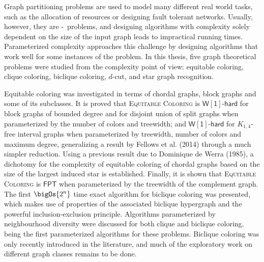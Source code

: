 Graph partitioning problems are used to model many different real world tasks, such as the allocation of resources or designing fault tolerant networks.
Usually, however, they are \NP-\Hard\ problems, and designing algorithms with complexity solely dependent on the size of the input graph leads to impractical running times.
Parameterized complexity approaches this challenge by designing algorithms that work well for some instances of the problem.
In this thesis, five graph theoretical problems were studied from the complexity point of view: equitable coloring, clique coloring, biclique coloring, $d$-cut, and star graph recognition.

Equitable coloring was investigated in terms of chordal graphs, block graphs and some of its subclasses.
It is proved that \textsc{Equitable Coloring} is  
$\mathsf{W[1]\text{-}hard}$ for block graphs of bounded degree and for disjoint union of split graphs when parameterized by the number of colors and treewidth; and %
$\mathsf{W[1]\text{-}hard}$ for $K_{1,4}$-free interval graphs when parameterized by treewidth, number of colors and maximum degree, generalizing a result by Fellows et al. (2014) through a much simpler reduction.
Using a previous result due to Dominique de Werra (1985), a dichotomy for the complexity of equitable coloring of chordal graphs based on the size of the largest induced star is established.
Finally, it is shown that 
\textsc{Equitable Coloring} is $\mathsf{FPT}$ when parameterized by the treewidth of the complement graph.
The first $\bigOs{2^n}$ time exact algorithm for biclique coloring was presented, which makes use of properties of the associated biclique hypergraph and the powerful inclusion-exclusion principle.
Algorithms parameterized by neighbourhood diversity were discussed for both clique and biclique coloring, being the first parameterized algorithms for these problems.
Biclique coloring was only recently introduced in the literature, and much of the exploratory work on different graph classes remains to be done.

